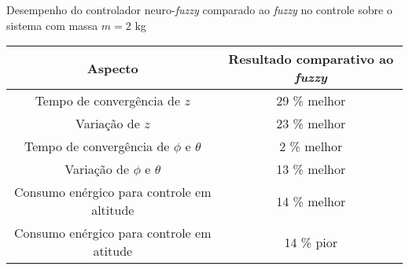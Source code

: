 \begin{quadro}[!htb]
    \centering
    \caption{Desempenho do controlador neuro-\textit{fuzzy} comparado ao \textit{fuzzy} no controle sobre o sistema com massa $m=2$ kg\label{qua:resultados_2kg_comparativo_fuzzy}}
    \begin{tabular}{|c|c|}
        \hline
        \textbf{Aspecto} & 
        \textbf{Resultado comparativo ao \textit{fuzzy}} \\
        \hline %
            Tempo de convergência de $z$ &
            29 \% melhor \\
        \hline %
            Variação de $z$ &
            23 \% melhor \\
        \hline %
            Tempo de convergência de $\phi$ e $\theta$ &
            2 \% melhor \\
        \hline %
            Variação de $\phi$ e $\theta$ &
            13 \% melhor \\
        \hline %
            Consumo enérgico para controle em altitude &
            14 \% melhor \\
        \hline %
            Consumo enérgico para controle em atitude &
            14 \% pior \\
        \hline
    \end{tabular}
\end{quadro}